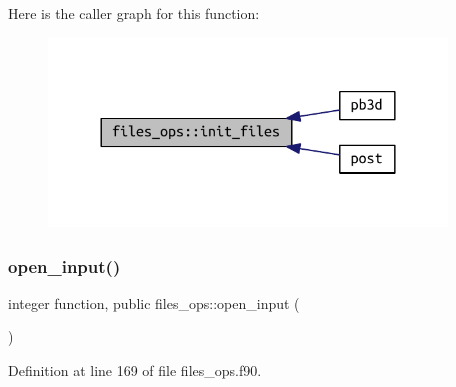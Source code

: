 Here is the caller graph for this function\+:
\nopagebreak
\begin{figure}[H]
\begin{center}
\leavevmode
\includegraphics[width=300pt]{namespacefiles__ops_a1e219b1147f109f758d03bef89d540e8_icgraph}
\end{center}
\end{figure}
\mbox{\label{namespacefiles__ops_a63a81a5a451f787025429878b2cec81b}} 
\subsubsection{\texorpdfstring{open\+\_\+input()}{open\_input()}}
{\footnotesize\ttfamily integer function, public files\+\_\+ops\+::open\+\_\+input (\begin{DoxyParamCaption}{ }\end{DoxyParamCaption})}



Definition at line 169 of file files\+\_\+ops.\+f90.

